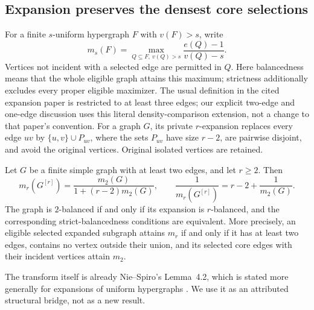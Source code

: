 
\subsection{Expansion preserves the densest core selections}

For a finite $s$-uniform hypergraph $F$ with $v(F)>s$, write
\[
 m_s(F)=\max_{Q\subseteq F,\ v(Q)>s}
           \frac{e(Q)-1}{v(Q)-s}.
\]
Vertices not incident with a selected edge are permitted in $Q$.
Here balancedness means that the whole eligible graph attains this maximum;
strictness additionally excludes every proper eligible maximizer. The usual
definition in the cited expansion paper is restricted to at least three
edges; our explicit two-edge and one-edge discussion uses this literal
density-comparison extension, not a change to that paper's convention.
For a graph $G$, its private $r$-expansion replaces every edge $uv$ by
$\{u,v\}\cup P_{uv}$, where the sets $P_{uv}$ have size $r-2$, are pairwise
disjoint, and avoid the original vertices. Original isolated vertices are retained.

\begin{proposition}
Let $G$ be a finite simple graph with at least two edges, and let $r\ge2$.
Then
\[
 m_r(G^{[r]})
   =\frac{m_2(G)}{1+(r-2)m_2(G)},\qquad
 \frac1{m_r(G^{[r]})}=r-2+\frac1{m_2(G)}.
\]
The graph is $2$-balanced if and only if its expansion is $r$-balanced,
and the corresponding strict-balancedness conditions are equivalent.
More precisely, an eligible selected expanded subgraph attains $m_r$
if and only if it has at least two edges, contains no vertex outside their
union, and its selected core edges with their incident vertices attain $m_2$.
\end{proposition}

The transform itself is already Nie--Spiro's Lemma~4.2, which is stated
more generally for expansions of uniform hypergraphs
\citep{niespiro_expansions2024}. We use it as an attributed structural
bridge, not as a new result.

